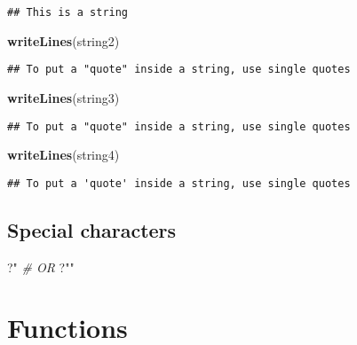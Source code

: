 \documentclass[
]{article}
\newenvironment{Shaded}{\begin{snugshade}}{\end{snugshade}}
\newcommand{\CommentTok}[1]{\textcolor[rgb]{0.56,0.35,0.01}{\textit{#1}}}
\newcommand{\KeywordTok}[1]{\textcolor[rgb]{0.13,0.29,0.53}{\textbf{#1}}}
\newcommand{\NormalTok}[1]{#1}
\newcommand{\StringTok}[1]{\textcolor[rgb]{0.31,0.60,0.02}{#1}}
\begin{document}
\begin{verbatim}
## This is a string
\end{verbatim}

\begin{Shaded}
\begin{Highlighting}[]
\KeywordTok{writeLines}\NormalTok{(string2)}
\end{Highlighting}
\end{Shaded}

\begin{verbatim}
## To put a "quote" inside a string, use single quotes
\end{verbatim}

\begin{Shaded}
\begin{Highlighting}[]
\KeywordTok{writeLines}\NormalTok{(string3)}
\end{Highlighting}
\end{Shaded}

\begin{verbatim}
## To put a "quote" inside a string, use single quotes
\end{verbatim}

\begin{Shaded}
\begin{Highlighting}[]
\KeywordTok{writeLines}\NormalTok{(string4)}
\end{Highlighting}
\end{Shaded}

\begin{verbatim}
## To put a 'quote' inside a string, use single quotes
\end{verbatim}

\hypertarget{special-characters}{%
\subsection{Special characters}\label{special-characters}}

\begin{Shaded}
\begin{Highlighting}[]
\NormalTok{?}\StringTok{\textquotesingle{}"\textquotesingle{}}
\CommentTok{\# OR}
\NormalTok{?}\StringTok{"\textquotesingle{}"}
\end{Highlighting}
\end{Shaded}

\hypertarget{functions}{%
\section{Functions}\label{functions}}
\end{document}
